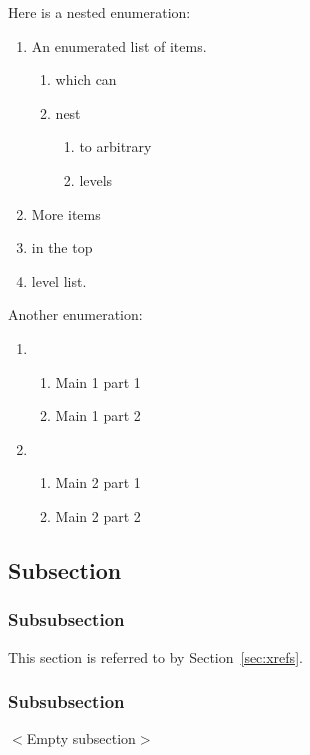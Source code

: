 Here is a nested enumeration:
\begin{enumerate}
	\item An enumerated list of items.
	\begin{enumerate}
		\item which can 
		\item nest
		\begin{enumerate}
			\item to arbitrary
			\item levels
		\end{enumerate}
	\end{enumerate}
	\item More items
	\item in the top
	\item level list.
\end{enumerate}
Another enumeration:
\begin{enumerate}
	\item
	\begin{enumerate}
		\item Main 1 part 1
		\item Main 1 part 2
	\end{enumerate}
	\item
	\begin{enumerate}
		\item Main 2 part 1
		\item Main 2 part 2
	\end{enumerate}
\end{enumerate}

\subsection{Subsection}

\subsubsection{Subsubsection}
\label{sec:nested}
This section is referred to by Section~\ref{sec:xrefs}.

\subsubsection{Subsubsection}
\textsf{$<$Empty subsection$>$}
